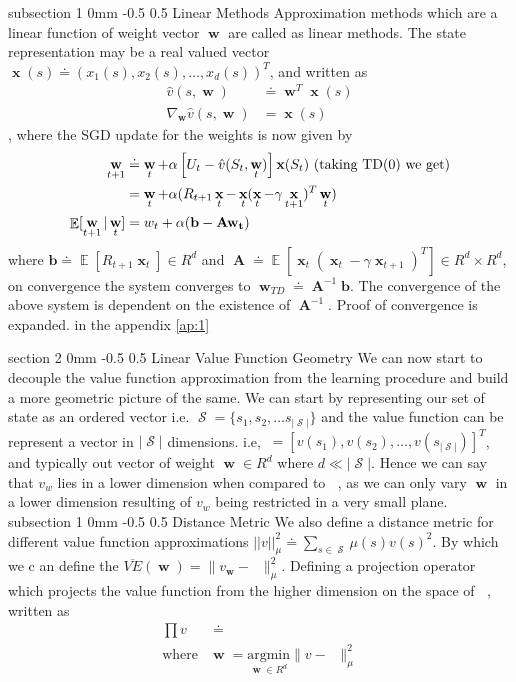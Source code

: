 \documentclass[twocolumn,11pt]{article}
\makeatletter
\DeclareMathOperator{\E}{\mathbb{E}}
\DeclareMathOperator{\w}{\textbf{w}}
\DeclareMathOperator{\state}{\mathcal{S}}
\DeclareMathOperator{\vp}{v_\pi} %
\DeclareMathOperator{\A}{ \textbf{A} }
\DeclareMathOperator{\x}{\textbf{x}}
\DeclareMathOperator{\vw}{v_{\w}}
\renewcommand{\section}{\@startsection
{section}%
{2}%
{0mm}%
{-0.5\baselineskip}%
{0.5\baselineskip}%
{\bfseries\color{blue}}} %
\renewcommand{\subsection}{\@startsection
{subsection}%
{1}%
{0mm}%
{-0.5\baselineskip}%
{0.5\baselineskip}%
{\bfseries\color{blue}}} %
\makeatother
\begin{document}
\subsection{Linear  Methods}
Approximation methods which are a  linear function of weight vector $\w$ are called  as linear methods. The state  representation may be a real valued vector $\x(s) \doteq (x_1(s), x_2(s), \ldots , x_d(s))^T$, and written as   \useshortskip
\begin{align*}
\hat{v}(s, \w) &\doteq \w^T\x(s) \\
\nabla_{\w} \hat{v}(s, \w) &= \x(s)
\end{align*}, where the SGD update for  the weights is now  given  by 
\begin{align*}
\w_{t+1} &\doteq  \w_t  +  \alpha \left[ U_t - \hat{v}(S_t, \w_t)\right]\x(S_t) \text{ (taking TD(0) we get)}\\
 &= \w_t + \alpha (R_{t+1} \x_t - \x_t(\x_t - \gamma \x_{t+1})^T\w_t)\\
\E[\w_{t+1}| \w_{t}]  &= w_t + \alpha( \bf b - Aw_t)
\end{align*}
where $ \textbf{b} \doteq \E[R_{t+1}\x_t] \in R^d$ and $\A \doteq \E[\x_t (\x_t  - \gamma \x_{t+1})^T] \in R^d \times R^d$, on convergence the system converges to $\w_{TD} \doteq \A^{-1}\textbf{b}$.
The convergence of the above system is  dependent on the existence of $\A^{-1}$. Proof of convergence is expanded. in the appendix \ref{ap:1}

\section{Linear Value Function  Geometry}
We can now start to decouple the value function approximation from the learning procedure and build a more geometric picture of the same. 
We can start by representing our set of state as an ordered vector i.e. $\state = \{s_1, s_2,  \ldots s_{|\state|} \}$ and the value function can be represent a vector in $|\state|$
dimensions. i.e,$\vp = \left[v(s_1), v(s_2), \ldots, v(s_{|\state|})\right]^T$,
 and typically out vector of weight $ \w \in R^d $ where
 $d \ll  | \state | $. 
Hence we can say  that $v_w$ lies in a lower dimension when compared to $\vp$,
as we can only vary $\w$ in a lower dimension resulting of $v_w$ being restricted in a very small plane. 
\subsection{Distance Metric}
We also define a distance metric for different value function approximations $||v||_\mu^2 \doteq \sum_{s \in \state} \mu(s) v(s)^2$. By which we c an  define the $\overline{VE}(\w) = \parallel v_{\w} - \vp\parallel_\mu^2$. Defining a projection operator which projects the value function from the higher dimension on the space of $\vw$, written as
\begin{align*}
\prod v &\doteq \vw \\
 \text{where} &
\w = \underset{\w \in R^d}{\text{argmin}} \parallel v - \vw\parallel_\mu^2
\end{align*} 
\end{document}
